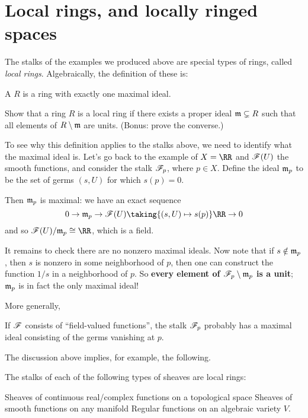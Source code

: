 \section{Local rings, and locally ringed spaces}
The stalks of the examples we produced above are special types
of rings, called \emph{local rings}.
Algebraically, the definition of these is:
\begin{definition}
	A  $R$ is a ring with exactly one maximal ideal.
\end{definition}
\begin{exercise}
	Show that a ring $R$ is a local ring if there exists
	a proper ideal $\mathfrak m \subsetneq R$ such that
	all elements of $R \setminus \mathfrak m$ are units.
	(Bonus: prove the converse.)
\end{exercise}

To see why this definition applies to the stalks above,
we need to identify what the maximal ideal is.
Let's go back to the example of $X = \RR$ and $\mathscr F(U)$ the smooth functions,
and consider the stalk $\mathscr F_{p}$, where $p \in X$.
Define the ideal $\mathfrak m_p$ to be the set of germs $(s,U)$ for which $s(p) = 0$.

Then $\mathfrak m_p$ is maximal: we have an exact sequence
\[ 0 \to \mm_p \to \SF(U) \taking{(s,U) \mapsto s(p)} \RR \to 0 \]
and so $\SF(U) / \mm_p \cong \RR$, which is a field.

It remains to check there are no nonzero maximal ideals.
Now note that if $s \notin \mathfrak m_p$,
then $s$ is nonzero in some neighborhood of $p$,
then one can construct the function $1/s$ in a neighborhood of $p$.
So \textbf{every element of $\mathscr F_p \setminus \mathfrak m_p$ is a unit};
$\mathfrak m_p$ is in fact the only maximal ideal!

More generally,
\begin{moral}
	If $\mathscr F$ consists of ``field-valued functions'',
	the stalk $\mathscr F_p$ probably has a maximal ideal
	consisting of the germs vanishing at $p$.
\end{moral}
The discussion above implies, for example, the following.
\begin{proposition}
	The stalks of each of the following types of sheaves are local rings:
	\begin{enumerate}[(a)]
		\ii Sheaves of continuous real/complex functions on a topological space
		\ii Sheaves of smooth functions on any manifold
		\ii Regular functions on an algebraic variety $V$.
	\end{enumerate}
\end{proposition}

